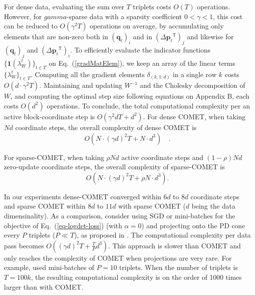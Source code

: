 \documentclass[twoside,11pt]{article}
\newcommand\mat[1]{{#1}}
\renewcommand\vec[1]{\mathbf{#1}}
\newcommand{\T}{{}^\mathsf{T}}
\newcommand{\W}{\mat{W}}
\renewcommand{\eqref}[1]{Eq.~(\ref{#1})}
\begin{document}
For dense data, evaluating the sum over $T$ triplets costs $O(T)$ operations. However, for $gamma$-sparse data with a sparsity coefficient $ 0< \gamma <1 $, this cost can be reduced to $O(\gamma^2 T)$ operations on average, by accumulating only elements that are non-zero both in $(\vec{q}_{t})_i$ and in $(\Delta\vec{p}_{t}\T)_j$ and likewise for $(\vec{q}_{t})_j$ and $(\Delta\vec{p}_{t}\T)_i$.  To efficiently evaluate the indicator functions $\{ \textbf{1}(\lambda_{W}^t) \}_{t \in T}$ on \eqref{gradMatElem}, we keep an array of the linear terms $\{\lambda_{W}^t\}_{t \in T}$. Computing all the gradient elements $\delta_{(k,1:d)}$ in a single row $k$ costs $O(d\cdot \gamma^2 T)$.
Maintaining and updating $\W^{-1}$ and the Cholesky decomposition of $\W$, and computing the optimal step size following equations on Appendix B, each costs $O(d^2)$ operations. To conclude, the total computational complexity per an active block-coordinate step is $O(\gamma^2 d T + d^2)$. 
For dense COMET, when taking $Nd$ coordinate steps, the overall complexity of dense COMET is 
\begin{equation}
    O(N \cdot (\gamma d)^2 T + N \cdot d^3) \quad.
    \label{cometComplexity}
\end{equation}

For sparse-COMET, when taking $\rho N d$ active coordinate steps and $(1-\rho) Nd$ zero-update coordinate steps, the overall complexity of sparse-COMET is
\begin{equation}
     O(N \cdot (\gamma d)^2 T + \rho N \cdot d^3).
     \label{spcometComplexity}
\end{equation}

In our experiments dense-COMET converged within $6 d$ to $8 d$ coordinate steps and sparse COMET within $8 d$ to $11 d$ with sparse COMET ($d$ being the data dimensinality). As a comparison, consider using SGD or mini-batches for the objective of \eqref{eq-logdet-loss} (with $
\alpha = 0$) and projecting onto the PD cone every $P$ triplets ($P \ll T$), as proposed in \citet{OASIS,qian}. The computational complexity per data pass becomes $O((\gamma d)^2 T + \frac{T}{P} d^3)$. This approach is slower than COMET and only reaches the complexity of COMET when projections are very rare. For example, \citet{qian} used mini-batches of $P=10$ triplets. When the number of triplets is $T=100k$, the resulting computational complexity is on the order of 1000 times larger than with COMET.
\end{document}
